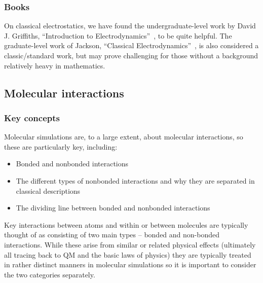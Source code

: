 \documentclass[9pt,bestpractices]{livecoms}
\begin{document}
\subsubsection{Books}

On classical electrostatics, we have found the undergraduate-level work by David J. Griffiths, ``Introduction to Electrodynamics''~\cite{Griffiths:2017:}, to be quite helpful.
The graduate-level work of Jackson, ``Classical Electrodynamics''~\cite{Jackson:1998:}, is also considered a classic/standard work, but may prove challenging for those without a background relatively heavy in mathematics.


\subsection{Molecular interactions}
\label{sec:mol_interactions}
\subsubsection{Key concepts}
Molecular simulations are, to a large extent, about molecular interactions, so these are particularly key, including:
\begin{itemize}
\item Bonded and nonbonded interactions
\item The different types of nonbonded interactions and why they are separated in classical descriptions
\item The dividing line between bonded and nonbonded interactions
\end{itemize}

Key interactions between atoms and within or between molecules are typically thought of as consisting of two main types -- bonded and non-bonded interactions.
While these arise from similar or related physical effects (ultimately all tracing back to QM and the basic laws of physics) they are typically treated in rather distinct manners in molecular simulations so it is important to consider the two categories
separately.
\end{document}

